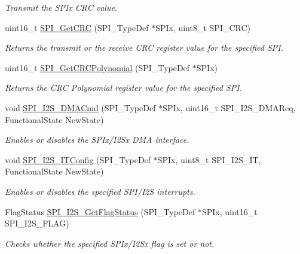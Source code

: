 \begin{DoxyCompactItemize}
\begin{DoxyCompactList}\small\item\em Transmit the S\-P\-Ix C\-R\-C value. \end{DoxyCompactList}\item 
uint16\-\_\-t \hyperlink{group___s_p_i_ga4c81c193516e82cf0a2fdc149ef20cc6}{S\-P\-I\-\_\-\-Get\-C\-R\-C} (S\-P\-I\-\_\-\-Type\-Def $\ast$S\-P\-Ix, uint8\-\_\-t S\-P\-I\-\_\-\-C\-R\-C)
\begin{DoxyCompactList}\small\item\em Returns the transmit or the receive C\-R\-C register value for the specified S\-P\-I. \end{DoxyCompactList}\item 
uint16\-\_\-t \hyperlink{group___s_p_i_ga80fb9374cfce670f29128bb78568353f}{S\-P\-I\-\_\-\-Get\-C\-R\-C\-Polynomial} (S\-P\-I\-\_\-\-Type\-Def $\ast$S\-P\-Ix)
\begin{DoxyCompactList}\small\item\em Returns the C\-R\-C Polynomial register value for the specified S\-P\-I. \end{DoxyCompactList}\item 
void \hyperlink{group___s_p_i_gabed5b91a8576e6d578f364cc0e807e4a}{S\-P\-I\-\_\-\-I2\-S\-\_\-\-D\-M\-A\-Cmd} (S\-P\-I\-\_\-\-Type\-Def $\ast$S\-P\-Ix, uint16\-\_\-t S\-P\-I\-\_\-\-I2\-S\-\_\-\-D\-M\-A\-Req, Functional\-State New\-State)
\begin{DoxyCompactList}\small\item\em Enables or disables the S\-P\-Ix/\-I2\-Sx D\-M\-A interface. \end{DoxyCompactList}\item 
void \hyperlink{group___s_p_i_ga17f4ef132e8ddbf94cb6b1688d181e41}{S\-P\-I\-\_\-\-I2\-S\-\_\-\-I\-T\-Config} (S\-P\-I\-\_\-\-Type\-Def $\ast$S\-P\-Ix, uint8\-\_\-t S\-P\-I\-\_\-\-I2\-S\-\_\-\-I\-T, Functional\-State New\-State)
\begin{DoxyCompactList}\small\item\em Enables or disables the specified S\-P\-I/\-I2\-S interrupts. \end{DoxyCompactList}\item 
Flag\-Status \hyperlink{group___s_p_i_ga1bd785d129e09c5734a876c8f2767204}{S\-P\-I\-\_\-\-I2\-S\-\_\-\-Get\-Flag\-Status} (S\-P\-I\-\_\-\-Type\-Def $\ast$S\-P\-Ix, uint16\-\_\-t S\-P\-I\-\_\-\-I2\-S\-\_\-\-F\-L\-A\-G)
\begin{DoxyCompactList}\small\item\em Checks whether the specified S\-P\-Ix/\-I2\-Sx flag is set or not. \end{DoxyCompactList}\item 

\end{DoxyCompactItemize}
